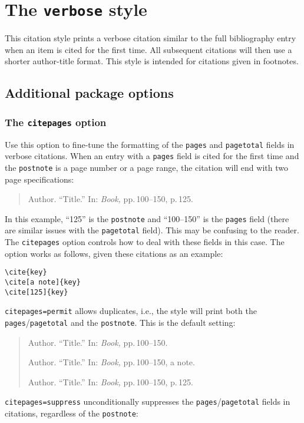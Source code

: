 \documentclass[a4paper]{article}
\begin{document}
\section*{The \texttt{verbose} style}

This citation style prints a verbose citation similar to the full
bibliography entry when an item is cited for the first time. All
subsequent citations will then use a shorter author-title format.
This style is intended for citations given in footnotes.

\subsection*{Additional package options}

\subsubsection*{The \texttt{citepages} option}

Use this option to fine-tune the formatting of the \texttt{pages}
and \texttt{pagetotal} fields in verbose citations. When an entry
with a \texttt{pages} field is cited for the first time and the
\texttt{postnote} is a page number or a page range, the citation
will end with two page specifications:

\begin{quote}
Author. \enquote{Title.} In: \emph{Book,} pp.\,100--150, p.\,125.
\end{quote}
%
In this example, \enquote{125} is the \texttt{postnote} and
\enquote{100--150} is the \texttt{pages} field (there are similar
issues with the \texttt{pagetotal} field). This may be confusing to
the reader. The \texttt{citepages} option controls how to deal with
these fields in this case. The option works as follows, given these
citations as an example:

\begin{verbatim}
\cite{key}
\cite[a note]{key}
\cite[125]{key}
\end{verbatim}
%
\texttt{citepages=permit} allows duplicates, i.e., the style will
print both the \texttt{pages}\slash \texttt{pagetotal} and the
\texttt{postnote}. This is the default setting:

\begin{quote}
Author. \enquote{Title.} In: \emph{Book,} pp.\,100--150.

Author. \enquote{Title.} In: \emph{Book,} pp.\,100--150, a note.

Author. \enquote{Title.} In: \emph{Book,} pp.\,100--150, p.\,125.
\end{quote}
%
\texttt{citepages=suppress} unconditionally suppresses the
\texttt{pages}\slash \texttt{pagetotal} fields in citations,
regardless of the \texttt{postnote}:
\end{document}
